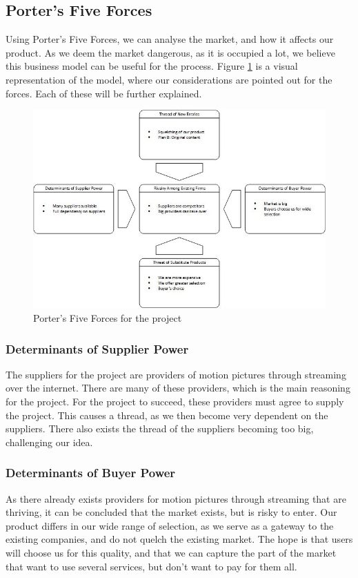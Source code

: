\subsection{Porter's Five Forces}

Using Porter's Five Forces, we can analyse the market, and how it affects our product. As we deem the market dangerous, as it is occupied a lot, we believe this business model can be useful for the process. Figure \ref{fig:five_forces} is a visual representation of the model, where our considerations are pointed out for the forces. Each of these will be further explained.

\begin{figure}[h]
    \begin{center}
        \includegraphics[scale=0.65]{./pics/five_forces}
        \caption{Porter's Five Forces for the project}
        \label{fig:five_forces}
    \end{center}
\end{figure}

\subsubsection*{Determinants of Supplier Power}
The suppliers for the project are providers of motion pictures through streaming over the internet. There are many of these providers, which is the main reasoning for the project. For the project to succeed, these providers must agree to supply the project. This causes a thread, as we then become very dependent on the suppliers. There also exists the thread of the suppliers becoming too big, challenging our idea.

\subsubsection*{Determinants of Buyer Power}
As there already exists providers for motion pictures through streaming that are thriving, it can be concluded that the market exists, but is risky to enter. Our product differs in our wide range of selection, as we serve as a gateway to the existing companies, and do not quelch the existing market. The hope is that users will choose us for this quality, and that we can capture the part of the market that want to use several services, but don't want to pay for them all.

